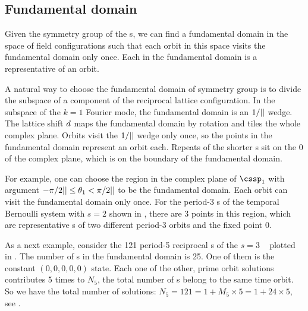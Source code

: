 

\subsection{Fundamental domain} %

Given the symmetry group of the {\lattstate}s,
we can find a fundamental domain in the space of field configurations
such that each orbit in this space visits the fundamental domain only once.
Each {\lattstate} in the fundamental domain is a representative {\lattstate} of an
orbit.

A natural way to choose the fundamental domain of \Cn{\cl{}} symmetry group
is to divide the subspace of a component of the reciprocal lattice configuration.
In the subspace of the $k=1$ Fourier mode, the fundamental domain is an $1/{||}$
wedge. The lattice shift $d$ maps the fundamental domain by rotation and
tiles the whole complex plane. Orbits visit the $1/{||}$
wedge only once, so the points in the fundamental domain represent an orbit each.
Repeats of the shorter {\lattstate}s sit on the 0 of the complex plane, which is on
the boundary of the fundamental domain.

For example, one can choose the region in the complex plane of $\cssp_1$ with
argument $-\pi/2{||}\leq\theta_1<\pi/2{||}$ to be the fundamental domain.
Each orbit can visit the fundamental domain only once. For the period-3 {\lattstate}s
of the {temporal Bernoulli system} with $s=2$ shown in ,
there are 3 points in this region, which are representative {\lattstate}s of two different
period-3 orbits and the fixed point $0$.

As a next example, consider the 121 period-5 reciprocal {\lattstate}s
of the $s=3$ \templatt\  plotted in .
The number of {\lattstate}s in the fundamental domain is 25. One of
them is the constant $(0,0,0,0,0)$ state. Each one of the other, prime orbit
solutions contributes 5 times to $N_5$, the total number of {\lattstate}s
belong to the same time orbit. So we have the total number of solutions:
$N_5=121=1+M_5\times5 = 1+24\times5$, see  .
